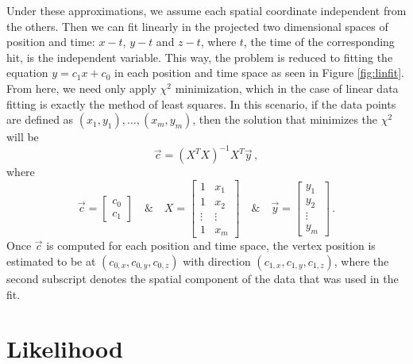 Under these approximations, we assume each spatial coordinate independent from the others. Then we can fit linearly in the projected two dimensional spaces of position and time: $x-t$, $y-t$ and $z-t$, where $t$, the time of the corresponding hit, is the independent variable. This way, the problem is reduced to fitting the equation $y=c_{1}x + c_{0}$ in each position and time space as seen in Figure \ref{fig:linfit}. From here, we need only apply $\chi^{2}$ minimization, which in the case of linear data fitting is exactly the method of least squares. In this scenario, if the data points are defined as $(x_{1},y_{1}), \dots, (x_{m},y_{m})$, then the solution that minimizes the $\chi^{2}$ will be
\begin{equation}
  \vec{c} = (X^{T}X)^{-1}X^{T}\vec{y}\, ,
\end{equation}
where
\begin{equation}
  \vec{c} =
  \begin{bmatrix}
    c_{0} \\
    c_{1}
  \end{bmatrix}
  \quad \& \quad
  X =
  \begin{bmatrix}
    1 & x_{1} \\
    1 & x_{2} \\
    \vdots & \vdots \\
    1 & x_{m}
  \end{bmatrix}
  \quad \& \quad
  \vec{y} = 
  \begin{bmatrix}
    y_{1} \\
    y_{2} \\
    \vdots \\
    y_{m}
  \end{bmatrix}\, .
\end{equation}
Once $\vec{c}$ is computed for each position and time space, the vertex position is estimated to be at $(c_{0,x}, c_{0,y}, c_{0,z})$ with direction $(c_{1,x}, c_{1,y}, c_{1,z})$, where the second subscript denotes the spatial component of the data that was used in the fit. 

\section{Likelihood}

